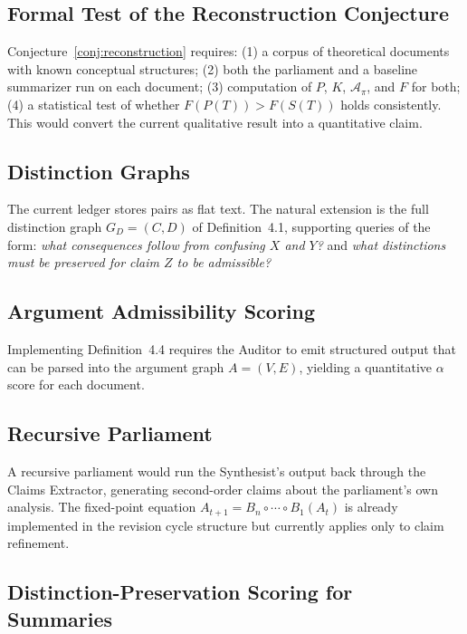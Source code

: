 \documentclass[12pt, a4paper]{article}
\theoremstyle{principle}
\theoremstyle{definition}
\begin{document}
\subsection{Formal Test of the Reconstruction Conjecture}

Conjecture~\ref{conj:reconstruction} requires: (1) a corpus of theoretical
documents with known conceptual structures; (2) both the parliament and a baseline
summarizer run on each document; (3) computation of $P$, $K$, $\mathcal{A}_\pi$,
and $F$ for both; (4) a statistical test of whether $F(P(T)) > F(S(T))$ holds
consistently. This would convert the current qualitative result into a
quantitative claim.

\subsection{Distinction Graphs}

The current ledger stores pairs as flat text. The natural extension is the full
distinction graph $G_D = (C, D)$ of Definition~4.1, supporting queries of the
form: \emph{what consequences follow from confusing $X$ and $Y$?} and \emph{what
distinctions must be preserved for claim $Z$ to be admissible?}

\subsection{Argument Admissibility Scoring}

Implementing Definition~4.4 requires the Auditor to emit structured output that
can be parsed into the argument graph $A = (V, E)$, yielding a quantitative
$\alpha$ score for each document.

\subsection{Recursive Parliament}

A recursive parliament would run the Synthesist's output back through the Claims
Extractor, generating second-order claims about the parliament's own analysis.
The fixed-point equation $A_{t+1} = B_n \circ \cdots \circ B_1(A_t)$ is already
implemented in the revision cycle structure but currently applies only to claim
refinement.

\subsection{Distinction-Preservation Scoring for Summaries}
\end{document}
